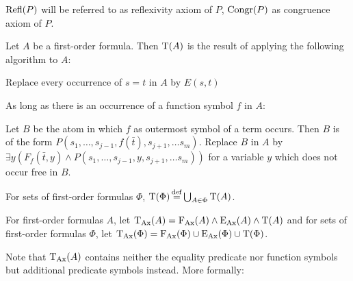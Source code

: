 $\operatorname{Refl}(P)$ will be referred to as reflexivity axiom of $P$, $\operatorname{Congr}(P)$ as congruence axiom of $P$.

\begin{defi}[label=exa:cont]
	\label{def:trans}
	Let $A$ be a first-order formula. Then $\operatorname{T}(A)$ is the result of applying the following algorithm to $A$:
	\begin{compactenum}
	\item Replace every occurrence of $s=t$ in $A$ by $E(s, t)$
	\label{def:trans_step1}
	\item As long as there is an occurrence of a function symbol $f$ in $A$:
	\label{def:trans_step2}

		Let $B$ be the atom in which $f$ as outermost symbol of a term occurs.
		Then $B$ is of the form $P(s_1, \ldots, s_{j-1}, f(\bar t),\allowbreak s_{j+1}, \ldots s_m)$.
		Replace $B$ in $A$ by $\exists y (F_f(\bar t, y) \land P(s_1, \ldots, s_{j-1}, y, s_{j+1}, \ldots s_m))$ for a variable $y$ which does not occur free in $B$.
	\end{compactenum}

	For sets of first-order formulas $\Phi$, $\operatorname{T}(\Phi) \operatorname{\stackrel{\mathrm{def}}{=}} \bigcup_{A\in\Phi} \operatorname{T}(A)$.
\end{defi}

\begin{defi}
For first-order formulas $A$, let $\operatorname{\operatorname{T}_{Ax}}(A) = \operatorname{F_{Ax}}(A) \land \operatorname{E_{Ax}}(A) \land \operatorname{T}(A)$ and for sets of first-order formulas $\Phi$, let $\operatorname{\operatorname{T}_{Ax}}(\Phi) = \operatorname{F_{Ax}}(\Phi) \cup \operatorname{E_{Ax}}(\Phi) \cup \operatorname{T}(\Phi)$.
\end{defi}


Note that $\operatorname{\operatorname{T}_{Ax}}(A)$ contains neither the equality predicate nor function symbols but additional predicate symbols instead. More formally:

